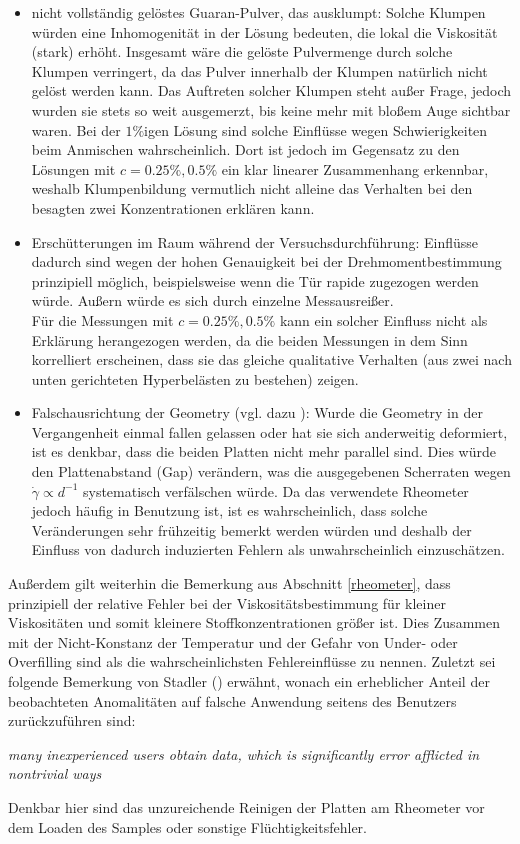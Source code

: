 \documentclass[11pt,a4paper,oneside]{scrartcl}
\begin{document}
\begin{itemize}
\item nicht vollständig gelöstes Guaran-Pulver, das ausklumpt: Solche Klumpen würden eine Inhomogenität in der Lösung bedeuten, die lokal die Viskosität (stark) erhöht. Insgesamt wäre die gelöste Pulvermenge durch solche Klumpen verringert, da das Pulver innerhalb der Klumpen natürlich nicht gelöst werden kann. Das Auftreten solcher Klumpen steht außer Frage, jedoch wurden sie stets so weit ausgemerzt, bis keine mehr mit bloßem Auge sichtbar waren. Bei der $1\%$igen Lösung sind solche Einflüsse wegen Schwierigkeiten beim Anmischen wahrscheinlich. Dort ist jedoch im Gegensatz zu den Lösungen mit $c=0.25\%,0.5\%$ ein klar linearer Zusammenhang erkennbar, weshalb Klumpenbildung vermutlich nicht alleine das Verhalten bei den besagten zwei Konzentrationen erklären kann.
\item Erschütterungen im Raum während der Versuchsdurchführung: Einflüsse dadurch sind wegen der hohen Genauigkeit bei der Drehmomentbestimmung prinzipiell möglich, beispielsweise wenn die Tür rapide zugezogen werden würde. Außern würde es sich durch einzelne Messausreißer.\\
Für die Messungen mit $c=0.25\%,0.5\%$ kann ein solcher Einfluss nicht als Erklärung herangezogen werden, da die beiden Messungen in dem Sinn korrelliert erscheinen, dass sie das gleiche qualitative Verhalten (aus zwei nach unten gerichteten Hyperbelästen zu bestehen) zeigen.
\item Falschausrichtung der Geometry (vgl. dazu \cite{Stadler2014}): Wurde die Geometry in der Vergangenheit einmal fallen gelassen oder hat sie sich anderweitig deformiert, ist es denkbar, dass die beiden Platten nicht mehr parallel sind. Dies würde den Plattenabstand (Gap) verändern, was die ausgegebenen Scherraten wegen $\dot\gamma\propto d^{-1}$ systematisch verfälschen würde. Da das verwendete Rheometer jedoch häufig in Benutzung ist, ist es wahrscheinlich, dass solche Veränderungen sehr frühzeitig bemerkt werden würden und deshalb der Einfluss von dadurch induzierten Fehlern als unwahrscheinlich einzuschätzen.
\end{itemize}
Außerdem gilt weiterhin die Bemerkung aus Abschnitt \ref{rheometer}, dass prinzipiell der relative Fehler bei der Viskositätsbestimmung für kleiner Viskositäten und somit kleinere Stoffkonzentrationen größer ist. Dies Zusammen mit der Nicht-Konstanz der Temperatur und der Gefahr von Under- oder Overfilling sind als die wahrscheinlichsten Fehlereinflüsse zu nennen. Zuletzt sei folgende Bemerkung von Stadler (\cite{Stadler2014}) erwähnt, wonach ein erheblicher Anteil der beobachteten Anomalitäten auf falsche Anwendung seitens des Benutzers zurückzuführen sind:\par
\begin{centering}
\emph{
\glqq many inexperienced users obtain data, which is significantly error afflicted in nontrivial ways\grqq
}\\
\end{centering}
\par
Denkbar hier sind das unzureichende Reinigen der Platten am Rheometer vor dem Loaden des Samples oder sonstige Flüchtigkeitsfehler.
\end{document}
